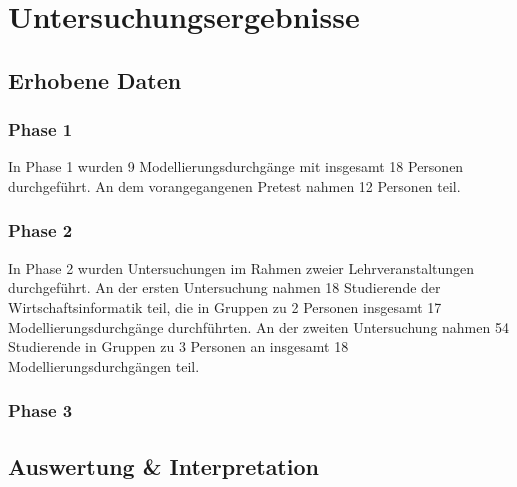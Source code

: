 \chapter{Untersuchungsergebnisse} %
\label{cha:untersuchungsergebnisse}

\section{Erhobene Daten} %
\label{sec:erhobene_daten}

\subsection{Phase 1} %
\label{sub:phase_1}

In Phase 1 wurden 9 Modellierungsdurchgänge mit insgesamt 18 Personen durchgeführt. An dem vorangegangenen Pretest nahmen 12 Personen teil.

\subsection{Phase 2} %
\label{sub:phase_2}

In Phase 2 wurden Untersuchungen im Rahmen zweier Lehrveranstaltungen durchgeführt. An der ersten Untersuchung nahmen 18 Studierende der Wirtschaftsinformatik teil, die in Gruppen zu 2 Personen insgesamt 17 Modellierungsdurchgänge durchführten. An der zweiten Untersuchung nahmen 54 Studierende in Gruppen zu 3 Personen an insgesamt 18 Modellierungsdurchgängen teil.

\subsection{Phase 3} %
\label{sub:phase_3}


\section{Auswertung \& Interpretation} %
\label{sec:auswertung_&_interpretation}

